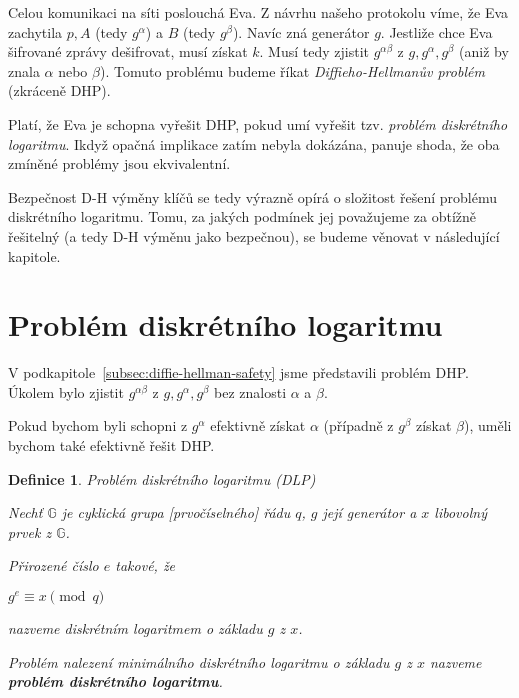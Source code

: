 \documentclass[12pt]{article}
\newtheorem{definition}{Definice}[section]
\begin{document}
        Celou komunikaci na síti poslouchá Eva. Z návrhu našeho protokolu víme, že Eva zachytila $p, A$ (tedy $g^\alpha$) a $B$ (tedy $g^\beta$).
        Navíc zná generátor $g$.
        Jestliže chce Eva šifrované zprávy dešifrovat, musí získat $k$.
        Musí tedy zjistit $g^{\alpha \beta}$ z $g, g^\alpha, g^\beta$ (aniž by znala $\alpha$ nebo $\beta$).
        Tomuto problému budeme říkat \emph{Diffieho-Hellmanův problém} (zkráceně DHP).

        Platí, že Eva je schopna vyřešit DHP, pokud umí vyřešit tzv. \emph{problém diskrétního logaritmu}.
        Ikdyž opačná implikace zatím nebyla dokázána, panuje shoda, že oba zmíněné problémy jsou ekvivalentní.

        Bezpečnost D-H výměny klíčů se tedy výrazně opírá o složitost řešení problému diskrétního logaritmu.
        Tomu, za jakých podmínek jej považujeme za obtížně řešitelný (a tedy D-H výměnu jako bezpečnou), se budeme věnovat v následující kapitole.
    

\section{Problém diskrétního logaritmu}\label{sec:discrete-log}

        V podkapitole~\ref{subsec:diffie-hellman-safety} jsme představili problém DHP.
        Úkolem bylo zjistit $g^{\alpha \beta}$ z $g, g^\alpha, g^\beta$ bez znalosti $\alpha$ a $\beta$.

        Pokud bychom byli schopni z $g^\alpha$ efektivně získat $\alpha$ (případně z $g^\beta$ získat $\beta$), uměli bychom také
        efektivně řešit DHP.

        \newpage

        \begin{definition}
            Problém diskrétního logaritmu (DLP)
            
            Nechť $\mathbb{G}$ je cyklická grupa [prvočíselného] řádu $q$, $g$ její generátor a $x$ libovolný prvek z $\mathbb{G}$.

            Přirozené číslo $e$ takové, že
                \begin{center}
                    $g^e \equiv x \pmod{q}$
                \end{center}
            
            nazveme diskrétním logaritmem o základu $g$ z $x$.

            Problém nalezení minimálního diskrétního logaritmu o základu $g$ z $x$ nazveme \textbf{problém diskrétního logaritmu}.

        \end{definition}
\end{document}
